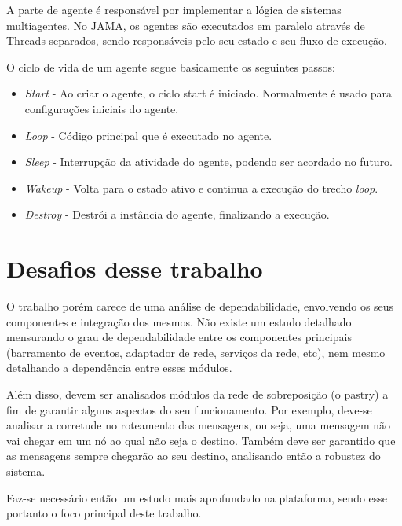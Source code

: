 A parte de agente é responsável por implementar a lógica de sistemas multiagentes. No JAMA, os agentes são executados em paralelo através de Threads separados, sendo responsáveis pelo seu estado e seu fluxo de execução.

O ciclo de vida de um agente segue basicamente os seguintes passos:

\begin{itemize}
	\item \emph{Start} - Ao criar o agente, o ciclo start é iniciado. Normalmente é usado para configurações iniciais do agente.
	\item \emph{Loop} - Código principal que é executado no agente.
	\item \emph{Sleep} - Interrupção da atividade do agente, podendo ser acordado no futuro.
	\item \emph{Wakeup} - Volta para o estado ativo e continua a execução do trecho \emph{loop}.
	\item \emph{Destroy} - Destrói a instância do agente, finalizando a execução.
\end{itemize}


\section{Desafios desse trabalho}
O trabalho porém carece de uma análise de dependabilidade, envolvendo os seus componentes e integração dos mesmos. Não existe um estudo detalhado mensurando o grau de dependabilidade entre os componentes principais (barramento de eventos, adaptador de rede, serviços da rede, etc), nem mesmo detalhando a dependência entre esses módulos.

Além disso, devem ser analisados módulos da rede de sobreposição (o pastry) a fim de garantir alguns aspectos do seu funcionamento. Por exemplo, deve-se analisar a corretude no roteamento das mensagens, ou seja, uma mensagem não vai chegar em um nó ao qual não seja o destino. Também deve ser garantido que as mensagens sempre chegarão ao seu destino, analisando então a robustez do sistema.

Faz-se necessário então um estudo mais aprofundado na plataforma, sendo esse portanto o foco principal deste trabalho.

























